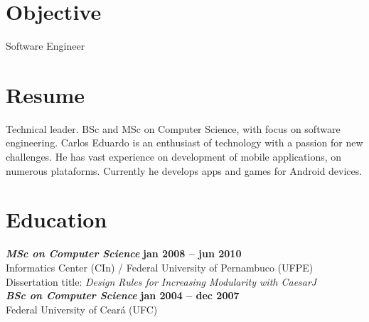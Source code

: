 \documentclass[margin, 10pt]{res} %
\begin{document}
\begin{resume}

 \vspace{-0.05in}
\section{Objective}  

Software Engineer

 
\section{Resume}  

Technical leader. BSc and MSc on Computer Science, with focus on software engineering. Carlos Eduardo is an enthusiast of technology with a passion for new challenges. He has vast experience on development of mobile applications, on numerous plataforms. Currently he develops apps and games for Android devices.


\section{Education}

{\sl\bf MSc on Computer Science} \hfill {\bf jan 2008 -- jun 2010} \\
Informatics Center (CIn) / Federal University of Pernambuco (UFPE) \\
Dissertation title: {\sl Design Rules for Increasing Modularity with CaesarJ}
\vspace{0.1in}
\\{\sl\bf BSc on Computer Science} \hfill {\bf jan 2004 -- dec 2007} \\
Federal University of Ceará (UFC)  
 
 

 

\end{resume}
\end{document}
